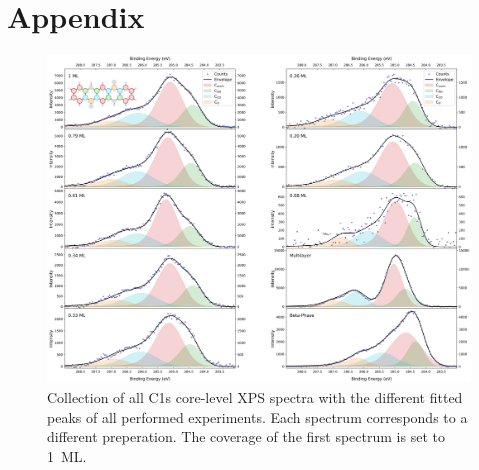 \chapter{Appendix}
\label{sec:appendix}
\raggedbottom

\begin{figure}[H]
	\centering
	\includegraphics[height=0.95\textwidth, angle=90]{images/C1s-all.png}
	\caption{Collection of all C1s core-level \ac{XPS} spectra with the different fitted peaks of all performed experiments. Each spectrum corresponds to a different preperation. The coverage of the first spectrum is set to 1~\ac{ML}.}
	\label{fig:C1s-stacked}
\end{figure}

